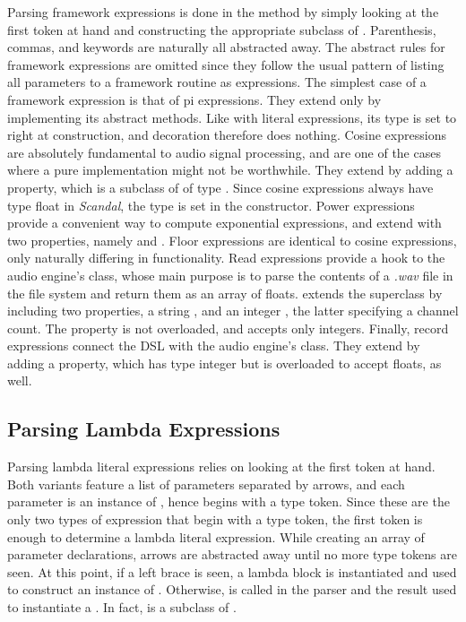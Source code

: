 Parsing framework expressions is done in the  method by simply looking at the first token at hand and constructing the appropriate subclass of . Parenthesis, commas, and keywords are naturally all abstracted away. The abstract rules for framework expressions are omitted since they follow the usual pattern of listing all parameters to a framework routine as expressions. The simplest case of a framework expression is that of pi expressions. They extend  only by implementing its abstract methods. Like with literal expressions, its type is set to  right at construction, and decoration therefore does nothing. Cosine expressions are absolutely fundamental to audio signal processing, and are one of the cases where a pure  implementation might not be worthwhile. They extend  by adding a  property, which is a subclass of  of type . Since cosine expressions always have type float in \emph{Scandal}, the type is set in the constructor. Power expressions provide a convenient way to compute exponential expressions, and extend  with two properties, namely  and . Floor expressions are identical to cosine expressions, only naturally differing in functionality. Read expressions provide a hook to the audio engine's  class, whose main purpose is to parse the contents of a \emph{.wav} file in the file system and return them as an array of floats.  extends the superclass by including two properties, a string , and an integer , the latter specifying a channel count. The  property is not overloaded, and accepts only integers. Finally, record expressions connect the DSL with the audio engine's  class. They extend  by adding a  property, which has type integer but is overloaded to accept floats, as well.

\subsection{Parsing Lambda Expressions}

Parsing lambda literal expressions relies on looking at the first token at hand. Both variants feature a list of parameters separated by arrows, and each parameter is an instance of , hence begins with a type token. Since these are the only two types of expression that begin with a type token, the first token is enough to determine a lambda literal expression. While creating an array of parameter declarations, arrows are abstracted away until no more type tokens are seen. At this point, if a left brace is seen, a lambda block is instantiated and used to construct an instance of . Otherwise,  is called in the parser and the result used to instantiate a . In fact,  is a subclass of .

